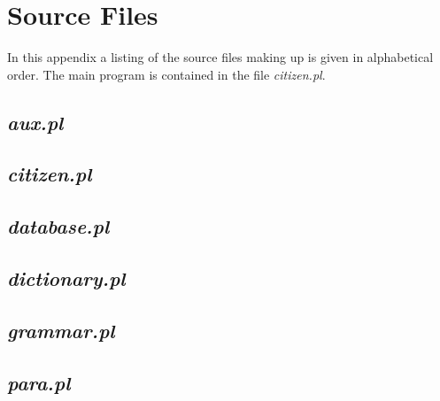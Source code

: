 
\chapter{Source Files}
\label{source}

In this appendix a listing of the source files making up {\nash} is
given in alphabetical order. The main program is contained in the file
{\em citizen.pl\/}.

\section*{\em aux.pl}



\newpage

\section*{\em citizen.pl}



\newpage

\section*{\em database.pl}



\newpage

\section*{\em dictionary.pl}



\newpage

\section*{\em grammar.pl}



\newpage

\section*{\em para.pl}

